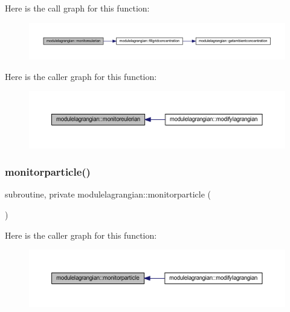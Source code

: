 Here is the call graph for this function\+:\nopagebreak
\begin{figure}[H]
\begin{center}
\leavevmode
\includegraphics[width=350pt]{namespacemodulelagrangian_ad6a4bcc42c67f187fb3a812f39b8c751_cgraph}
\end{center}
\end{figure}
Here is the caller graph for this function\+:\nopagebreak
\begin{figure}[H]
\begin{center}
\leavevmode
\includegraphics[width=350pt]{namespacemodulelagrangian_ad6a4bcc42c67f187fb3a812f39b8c751_icgraph}
\end{center}
\end{figure}
\mbox{\label{namespacemodulelagrangian_a71a2aeb4e1c33422d4189e27f77e15e6}} 
\subsubsection{\texorpdfstring{monitorparticle()}{monitorparticle()}}
{\footnotesize\ttfamily subroutine, private modulelagrangian\+::monitorparticle (\begin{DoxyParamCaption}{ }\end{DoxyParamCaption})\hspace{0.3cm}{\ttfamily [private]}}

Here is the caller graph for this function\+:\nopagebreak
\begin{figure}[H]
\begin{center}
\leavevmode
\includegraphics[width=350pt]{namespacemodulelagrangian_a71a2aeb4e1c33422d4189e27f77e15e6_icgraph}
\end{center}
\end{figure}
\mbox{\label{namespacemodulelagrangian_a56e2a0655f742104a77b7d6d4040508f}} 
